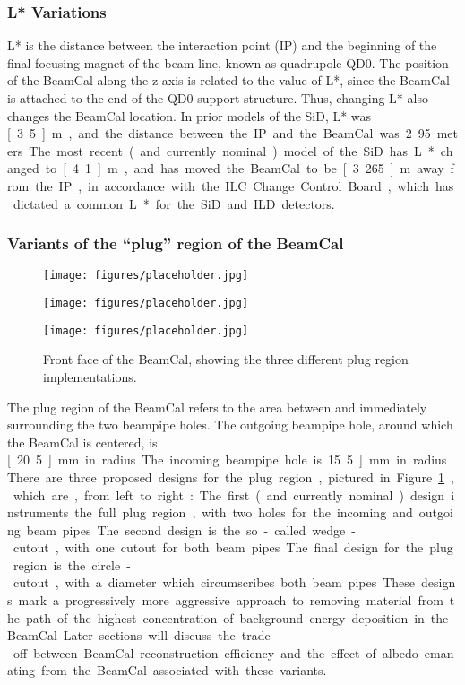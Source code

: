 \subsubsection{L* Variations}
L* is the distance between the interaction point (IP) and the beginning of the final focusing magnet of the beam line, known as quadrupole QD0. The position of the BeamCal along the z-axis is related to the value of L*, since the BeamCal is attached to the end of the QD0 support structure. Thus, changing L* also changes the BeamCal location. In prior models of the SiD, L* was \unit[3.5]{m}, and the distance between the IP and the BeamCal was 2.95 meters. The most recent (and currently nominal) model of the SiD has L* changed to \unit[4.1]{m}, and has moved the BeamCal to be \unit[3.265]{m} away from the IP, in accordance with the ILC Change Control Board, which has dictated a common L* for the SiD and ILD detectors.

\subsubsection{Variants of the ``plug'' region of the BeamCal}
\begin{figure}[h]
    \centering
    \begin{minipage}{0.3\textwidth}
        \texttt{[image: figures/placeholder.jpg]}
    \end{minipage}
    \begin{minipage}{0.3\textwidth}
        \texttt{[image: figures/placeholder.jpg]}
    \end{minipage}
    \begin{minipage}{0.3\textwidth}
        \texttt{[image: figures/placeholder.jpg]}
    \end{minipage}
    \caption{Front face of the BeamCal, showing the three different plug region implementations.}
    \label{fig__beamcal_face}
\end{figure}

The plug region of the BeamCal refers to the area between and immediately surrounding the two beampipe holes. The outgoing beampipe hole, around which the BeamCal is centered, is \unit[20.5]{mm} in radius. The incoming beampipe hole is \unit15.5]{mm} in radius. There are three proposed designs for the plug region, pictured in Figure~\ref{fig__beamcal_face}, which are, from left to right: The first (and currently nominal) design instruments the full plug region, with two holes for the incoming and outgoing beam pipes. The second design is the so-called wedge-cutout, with one cutout for both beam pipes. The final design for the plug region is the circle-cutout, with a diameter which circumscribes both beam pipes. These designs mark a progressively more aggressive approach to removing material from the path of the highest concentration of background energy deposition in the BeamCal. Later sections will discuss the trade-off between BeamCal reconstruction efficiency and the effect of albedo emanating from the BeamCal associated with these variants.
